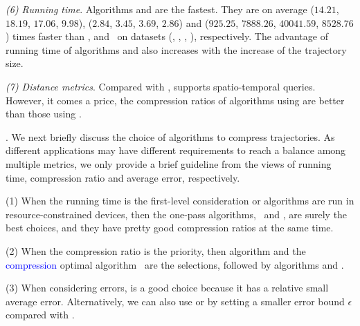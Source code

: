 {\sstab\emph{(6) Running time}. Algorithms \cist and \cista are the fastest. They are on average
($14.21$, $18.19$, $17.06$, $9.98$), ($2.84$, $3.45$, $3.69$, $2.86$) and ($925.25$, $7888.26$, $40041.59$, $8528.76$) times faster than \dps, \squishe and \osed~on datasets (\sercar, \geolife, \mopsi, \pricar), respectively.
The advantage of running time of algorithms \cist and \cista also increases  with the increase of the trajectory size.


\sstab \emph{(7) Distance metrics}. Compared with \ped, \sed supports  spatio-temporal queries. However, it comes a price, \eg  the compression ratios of algorithms using \ped are better than those using \sed.}



. We next briefly discuss the choice of algorithms to compress trajectories.
As different applications may have different requirements to reach a balance among multiple metrics, we only provide a brief guideline from the views of running time, compression ratio and average error, respectively.

\sstab(1) When the running time is the first-level consideration or algorithms are run in resource-constrained devices, then the one-pass algorithms, \ie~\cist and \cista, are surely the best choices, and they have pretty good compression ratios at the same time.

\sstab(2) When the compression ratio is the priority, then algorithm \cista and the \textcolor{blue}{compression} optimal algorithm \osed~are the selections, followed by algorithms \dps and \cist.

\sstab(3) When considering errors, \squishe is a good choice because it has a relative small average error. Alternatively, we can also use \dps or \cist by setting a smaller error bound $\epsilon$ compared with \squishe.




